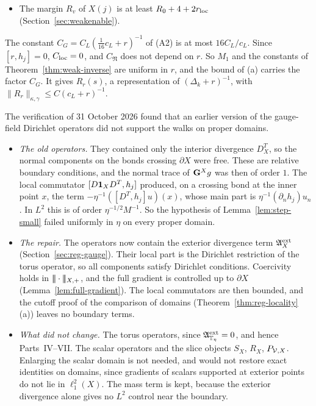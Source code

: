 \begin{enumerate}[label=(L\arabic*)]
\begin{itemize}
  \item The margin $R_v$ of $X(j)$ is at least $R_0+4+2r_{\rm loc}$ (Section~\ref{sec:weakenable}).
  \end{itemize}
  The constant $C_G=C_L(\frac1{16}c_L+r)^{-1}$ of (A2) is at most $16C_L/c_L$. Since $[r,h_j]=0$, $C_{\rm loc}=0$, and $C_{\mathfrak N}$ does not depend on $r$. So $M_1$ and the constants of Theorem~\ref{thm:weak-inverse} are uniform in $r$, and the bound of (a) carries the factor $C_G$. It gives $R_r(s)$, a representation of $(\Delta_k+r)^{-1}$, with $\|R_r\|_{\kappa,\gamma}\le C(c_L+r)^{-1}$.
\end{enumerate}

\begin{remark}\label{rem:L3-domains}
The verification of 31 October 2026 found that an earlier version of the gauge-field Dirichlet operators did not support the walks on proper domains.
\begin{itemize}
\item \emph{The old operators.} They contained only the interior divergence $D^T_X$, so the normal components on the bonds crossing $\partial X$ were free. These are relative boundary conditions, and the normal trace of $\mathbf G^Xg$ was then of order $1$. The local commutator $[D\mathbf 1_XD^T,h_j]$ produced, on a crossing bond at the inner point $x$, the term $-\eta^{-1}([D^T,h_j]u)(x)$, whose main part is $\eta^{-1}(\partial_nh_j)u_n$. In $L^2$ this is of order $\eta^{-1/2}M^{-1}$. So the hypothesis of Lemma~\ref{lem:step-small} failed uniformly in $\eta$ on every proper domain.
\item \emph{The repair.} The operators now contain the exterior divergence term $\mathfrak A^{\rm ext}_X$ (Section~\ref{sec:reg-gauge}). Their local part is the Dirichlet restriction of the torus operator, so all components satisfy Dirichlet conditions. Coercivity holds in $|\!|\!|\cdot|\!|\!|_{X,+}$, and the full gradient is controlled up to $\partial X$ (Lemma~\ref{lem:full-gradient}). The local commutators are then bounded, and the cutoff proof of the comparison of domains (Theorem~\ref{thm:reg-locality}(a)) leaves no boundary terms.
\item \emph{What did not change.} The torus operators, since $\mathfrak A^{\rm ext}_{\mathbb T_\eta}=0$, and hence Parts~IV--VII. The scalar operators and the slice objects $S_X$, $R_X$, $P_{\mathcal V,X}$. Enlarging the scalar domain is not needed, and would not restore exact identities on domains, since gradients of scalars supported at exterior points do not lie in $\ell^2_1(X)$. The mass term is kept, because the exterior divergence alone gives no $L^2$ control near the boundary.
\end{itemize}
\end{remark}

